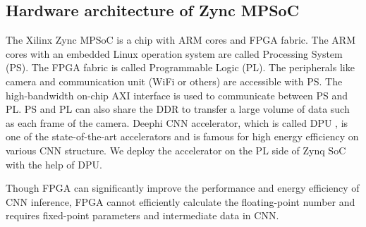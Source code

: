 \subsection{Hardware architecture of Zync MPSoC}
The Xilinx Zync MPSoC is a chip with ARM cores and FPGA fabric. The ARM cores with an embedded Linux operation system are called Processing System (PS). The FPGA fabric is called Programmable Logic (PL). The peripherals like camera and communication unit (WiFi or others) are accessible with PS. The high-bandwidth on-chip AXI interface is used to communicate between PS and PL. PS and PL can also share the DDR to transfer a large volume of data such as each frame of the camera.
Deephi CNN accelerator, which is called DPU \cite{Tech:2019360}, is one of the state-of-the-art accelerators and is famous for high energy efficiency on various CNN structure. We deploy the accelerator on the PL side of Zynq SoC with the help of DPU.


Though FPGA can significantly improve the performance and energy efficiency of CNN inference, FPGA cannot efficiently calculate the floating-point number and requires fixed-point parameters and intermediate data in CNN.



